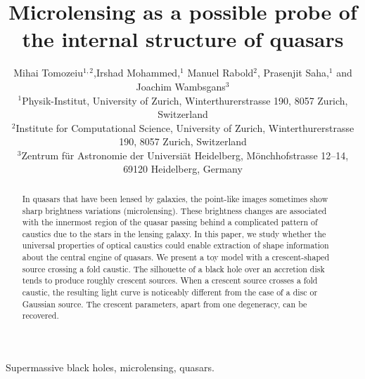 \documentclass[usenatbib]{mn2e}
\title{Microlensing as a possible probe of the internal structure of quasars}
\author[Tomozeiu et al]{Mihai Tomozeiu$^{1,2}$,Irshad Mohammed,$^1$ Manuel Rabold$^2$,
\newauthor
Prasenjit Saha,$^1$ and Joachim Wambsgans$^3$\\
$^1${Physik-Institut, University of Zurich, Winterthurerstrasse 190,
  8057 Zurich, Switzerland} \\
$^2${Institute for Computational Science, University of Zurich,
  Winterthurerstrasse 190, 8057 Zurich, Switzerland} \\
$^3${Zentrum f\"ur Astronomie der Universi\"at Heidelberg,
  M\"onchhofstrasse 12--14, 69120 Heidelberg, Germany}
}
\begin{document}
\maketitle

\begin{abstract}

In quasars that have been lensed by galaxies, the point-like images
sometimes show sharp brightness variations (microlensing).  These
brightness changes are associated with the innermost region of the
quasar passing behind a complicated pattern of caustics due to the
stars in the lensing galaxy.  In this paper, we study whether the
universal properties of optical caustics could enable extraction of
shape information about the central engine of quasars.  We present a
toy model with a crescent-shaped source crossing a fold caustic.  The
silhouette of a black hole over an accretion disk tends to produce
roughly crescent sources.  When a crescent source crosses a fold
caustic, the resulting light curve is noticeably different from the
case of a disc or Gaussian source.  The crescent parameters, apart
from one degeneracy, can be recovered.
\end{abstract}


\begin{keywords}
Supermassive black holes, microlensing, quasars.
\end{keywords}


















\def\apj{ApJ}
\def\apjl{ApJL}
\def\aj{AJ}
\def\mnras{MNRAS}
\def\aap{A\&A}
\def\nat{nature}
\def\araa{ARAA}
\def\pasa{PASA}

\end{document}
